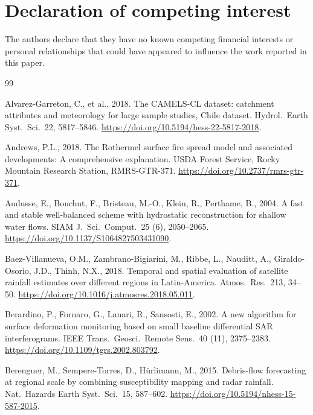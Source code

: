 \documentclass[authoryear,preprint,review,12pt]{elsarticle}
\begin{document}
\section*{Declaration of competing interest}

The authors declare that they have no known competing financial interests or
personal relationships that could have appeared to influence the work reported in
this paper.

\begin{thebibliography}{99}

Alvarez-Garreton, C., et al., 2018. The CAMELS-CL dataset: catchment attributes
and meteorology for large sample studies, Chile dataset. Hydrol.\ Earth Syst.\
Sci.\ 22, 5817--5846. \url{https://doi.org/10.5194/hess-22-5817-2018}.

Andrews, P.L., 2018. The Rothermel surface fire spread model and associated
developments: A comprehensive explanation. USDA Forest Service, Rocky Mountain
Research Station, RMRS-GTR-371. \url{https://doi.org/10.2737/rmrs-gtr-371}.

Audusse, E., Bouchut, F., Bristeau, M.-O., Klein, R., Perthame, B., 2004. A fast
and stable well-balanced scheme with hydrostatic reconstruction for shallow water
flows. SIAM J.\ Sci.\ Comput.\ 25 (6), 2050--2065.
\url{https://doi.org/10.1137/S1064827503431090}.

Baez-Villanueva, O.M., Zambrano-Bigiarini, M., Ribbe, L., Nauditt, A.,
Giraldo-Osorio, J.D., Thinh, N.X., 2018. Temporal and spatial evaluation of
satellite rainfall estimates over different regions in Latin-America. Atmos.\
Res.\ 213, 34--50. \url{https://doi.org/10.1016/j.atmosres.2018.05.011}.

\bibitem[Berardino et al.(2002)]{berardino2002}
Berardino, P., Fornaro, G., Lanari, R., Sansosti, E., 2002. A new algorithm for
surface deformation monitoring based on small baseline differential SAR
interferograms. IEEE Trans.\ Geosci.\ Remote Sens.\ 40 (11), 2375--2383.
\url{https://doi.org/10.1109/tgrs.2002.803792}.

Berenguer, M., Sempere-Torres, D., H\"urlimann, M., 2015. Debris-flow forecasting
at regional scale by combining susceptibility mapping and radar rainfall. Nat.\
Hazards Earth Syst.\ Sci.\ 15, 587--602.
\url{https://doi.org/10.5194/nhess-15-587-2015}.


\end{thebibliography}
\end{document}
